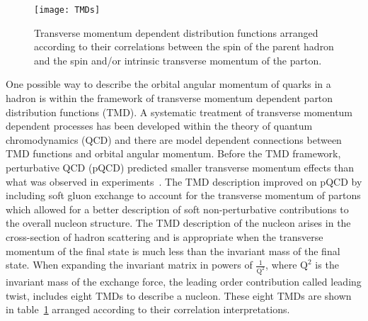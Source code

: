 \begin{figure}[h]
  \centering
  \texttt{[image: TMDs]}
  \caption{Transverse momentum dependent distribution functions
    arranged according to their correlations between the spin of the
    parent hadron and the spin and/or intrinsic transverse momentum of
    the parton.}
  \label{fig:TMDs}
\end{figure}

One possible way to describe the orbital angular momentum of quarks in
a hadron is within the framework of transverse momentum dependent
parton distribution functions (TMD).  A systematic treatment of
transverse momentum dependent processes has been developed within the
theory of quantum chromodynamics (QCD) and there are model dependent
connections between TMD functions and orbital angular momentum.
Before the TMD framework, perturbative QCD (pQCD) predicted smaller
transverse momentum effects than what was observed in experiments~\cite{Perdekamp}.
The TMD description improved on pQCD by including soft gluon exchange to account for the transverse momentum of partons which allowed for a better description of
soft non-perturbative contributions to the overall nucleon structure.
The TMD description of the nucleon arises in the cross-section of
hadron scattering and is appropriate when the transverse momentum of
the final state is much less than the invariant mass of the final
state.  When expanding the invariant matrix in powers of
$\frac{1}{\mathrm{Q}^2}$, where $\mathrm{Q}^2$ is the invariant mass
of the exchange force, the leading order contribution called leading
twist, includes eight TMDs to describe a nucleon.  These eight TMDs
are shown in table~\ref{fig:TMDs} arranged according to their
correlation interpretations. \par


